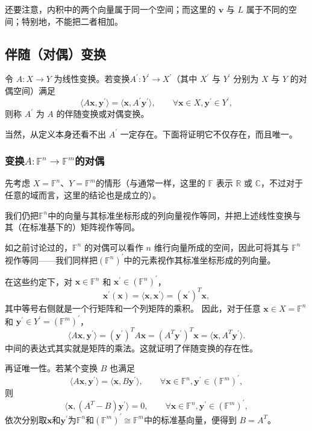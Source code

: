 还要注意，内积中的两个向量属于同一个空间；而这里的 $\mathbf{v}$ 与 $L$ 属于不同的空间；特别地，不能把二者相加。

\subsection{伴随（对偶）变换}

\begin{definition}
    令 $A:X\to Y$ 为线性变换。若变换$A^\prime:Y^\prime\to X^\prime$（其中 $X^\prime$ 与 $Y^\prime$ 分别为 $X$ 与 $Y$ 的对偶空间）满足
    \[
        \langle A\mathbf{x},\mathbf{y}^\prime\rangle
        =
        \langle\mathbf{x},A^\prime\mathbf{y}^\prime\rangle,
        \qquad
        \forall\mathbf{x}\in X,\mathbf{y}^\prime\in Y^\prime,
    \]
    则称 $A^\prime$ 为 $A$ 的伴随变换或对偶变换。
\end{definition}

当然，从定义本身还看不出 $A^\prime$ 一定存在。下面将证明它不仅存在，而且唯一。

\subsubsection{\texorpdfstring{变换$A:\mathbb{F}^n\to \mathbb{F}^m$}{F\^{}n到F\^{}m的变换A}的对偶}

先考虑 $X=\mathbb{F}^n$、$Y=\mathbb{F}^m$的情形（与通常一样，这里的 $\mathbb{F}$ 表示 $\mathbb{R}$ 或 $\mathbb{C}$，不过对于任意的域而言，这里的结论也是成立的）。

我们仍把$\mathbb{F}^n$中的向量与其标准坐标形成的列向量视作等同，并把上述线性变换与其（在标准基下的）矩阵视作等同。

如之前讨论过的，$\mathbb{F}^n$ 的对偶可以看作 $n$ 维行向量所成的空间，因此可将其与 $\mathbb{F}^n$ 视作等同——我们同样把$(\mathbb{F}^n)^\prime$中的元素视作其标准坐标形成的列向量。

在这些约定下，对 $\mathbf{x}\in\mathbb{F}^n$ 和
$\mathbf{x}^\prime\in(\mathbb{F}^n)^\prime$，
\[
    \mathbf{x}^\prime(\mathbf{x})=
    \langle\mathbf{x},\mathbf{x}^\prime\rangle
    =(\mathbf{x}^\prime)^T\mathbf{x},
\]
其中等号右侧就是一个行矩阵和一个列矩阵的乘积。
因此，对于任意 $\mathbf{x}\in X=\mathbb{F}^n$ 和
$\mathbf{y}^\prime \in Y^\prime=(\mathbb{F}^m)^\prime$，
\[
    \langle A\mathbf{x},\mathbf{y}^\prime\rangle
    =(\mathbf{y}^\prime)^TA\mathbf{x}
    =(A^T\mathbf{y}^\prime)^T\mathbf{x}
    =\langle\mathbf{x},A^T\mathbf{y}^\prime\rangle.
\]
中间的表达式其实就是矩阵的乘法。这就证明了伴随变换的存在性。

再证唯一性。若某个变换 $B$ 也满足
\[
    \langle A\mathbf{x},\mathbf{y}^\prime\rangle
    =\langle\mathbf{x},B\mathbf{y}^\prime\rangle,
    \qquad
    \forall\mathbf{x}\in \mathbb{F}^n,\mathbf{y}^\prime\in (\mathbb{F}^m)^\prime,
\]
则
\[
    \langle\mathbf{x},(A^T-B)\mathbf{y}^\prime\rangle=0,
    \qquad
    \forall\mathbf{x}\in \mathbb{F}^n,\mathbf{y}^\prime\in (\mathbb{F}^m)^\prime,
\]
依次分别取$\mathbf{x}$和$\mathbf{y}^\prime$为$\mathbb{F}^n$和$(\mathbb{F}^m)^\prime \cong \mathbb{F}^m$中的标准基向量，便得到 $B=A^T$。

